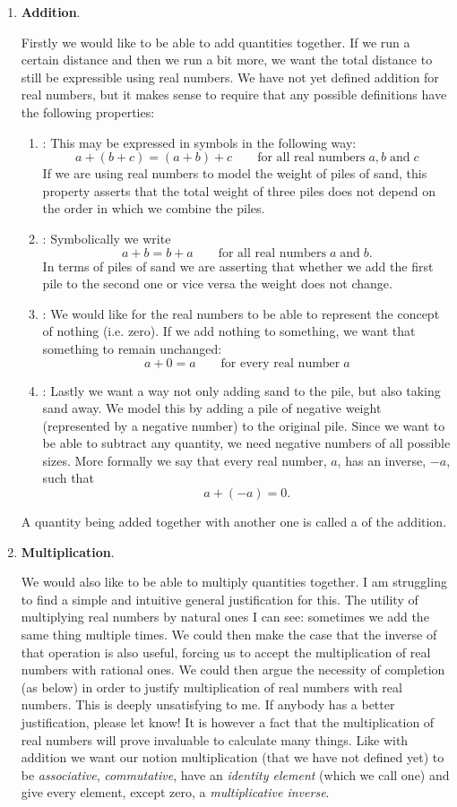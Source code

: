 \begin{enumerate}
\item \textbf{Addition}.

Firstly we would like to be able to add quantities together. If we run a certain distance and then we run a bit more, we want the total distance to still be expressible using real numbers. We have not yet defined addition for real numbers, but it makes sense to require that any possible definitions have the following properties:
\begin{enumerate}
\item {}: This may be expressed in symbols in the following way:
\[ a + (b+c) = (a+b)+c \qquad \text{for all real numbers} \;a,b \;\text{and}\; c \]
If we are using real numbers to model the weight of piles of sand, this property asserts that the total weight of three piles does not depend on the order in which we combine the piles.
\item {}: Symbolically we write
\[ a + b = b + a \qquad \text{for all real numbers}\; a \; \text{and} \; b. \]
In terms of piles of sand we are asserting that whether we add the first pile to the second one or vice versa the weight does not change.
\item {}: We would like for the real numbers to be able to represent the concept of nothing (i.e. zero). If we add nothing to something, we want that something to remain unchanged:
\[ a + 0 = a \qquad \text{for every real number} \; a \]
\item {}: Lastly we want a way not only adding sand to the pile, but also taking sand away. We model this by adding a pile of negative weight (represented by a negative number) to the original pile. Since we want to be able to subtract any quantity, we need negative numbers of all possible sizes. More formally we say that every real number, $a$, has an inverse, $-a$, such that
\[ a + (-a) = 0.\]
\end{enumerate}
A quantity being added together with another one is called a  of the addition.

\item \textbf{Multiplication}.

We would also like to be able to multiply quantities together. I am struggling to find a simple and intuitive general justification for this. The utility of multiplying real numbers by natural ones I can see: sometimes we add the same thing multiple times. We could then make the case that the inverse of that operation is also useful, forcing us to accept the multiplication of real numbers with rational ones. We could then argue the necessity of completion (as below) in order to justify multiplication of real numbers with real numbers. This is deeply unsatisfying to me. If anybody has a better justification, please let know! It is however a fact that the multiplication of real numbers will prove invaluable to calculate many things. Like with addition we want our notion multiplication (that we have not defined yet) to be \emph{associative}, \emph{commutative}, have an \emph{identity element} (which we call one) and give every element, except zero, a \emph{multiplicative inverse}.


\end{enumerate}
